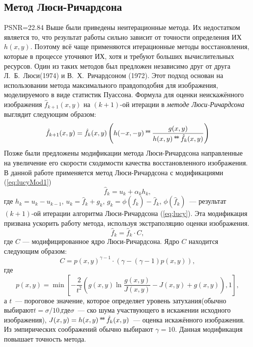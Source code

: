 \subsection{Метод Люси-Ричардсона}
PSNR=22.84
Выше были приведены неитерационные метода. Их недостатком является то, что результат работы сильно зависит от точности определения ИХ $h(x,y)$. Поэтому всё чаще применяются итерационные методы восстановления, которые в процессе уточняют ИХ, хотя и требуют больших вычислительных ресурсов. Один из таких методов был предложен независимо друг от друга Л.~Б.~Люси(1974)\cite{lucy} и В.~Х.~Ричардсоном (1972)\cite{richardson}. Этот подход основан на использовании метода максимального правдоподобия для изображения, моделируемого в виде статистик Пуассона. Формула для оценки неискажённого изображения $\hat{f}_{k+1}(x,y)$ на $(k + 1)$-ой итерации в \textit{методе Люси-Ричардсона} выглядит следующим образом:
\begin{equation}\label{eq:lucy}
	\hat{f}_{k+1}(x,y) = \hat{f}_k(x,y) \left(h(-x,-y) \operatorname*{*\!*} \frac{g(x,y)}{h(x,y) \operatorname*{*\!*} \hat{f}_k(x,y)}\right)
\end{equation}
Позже были предложены модификации метода Люси-Ричардсона \cite{richardsonLucyModifiedBiggs} направленные на увеличение его скорости сходимости качества восстановленного изображения. В данной работе применяется метод Люси-Ричардсона с модификациями (\ref{eq:lucyMod1})%
\begin{equation}\label{eq:lucyMod1}
	\hat{f}_k=u_k+\alpha_k h_k,
\end{equation}
где $h_k = u_k - u_{k-1}$, $u_k = \hat{f}_k + g_k$, $g_k = \phi(\hat{f}_k)-\hat{f}_k$, $\phi(\hat{f}_k)$~--- результат $(k+1)$-ой итерации алгоритма Люси-Ричардсона (\ref{eq:lucy}). Эта модификация призвана ускорить работу метода, используя экстраполяцию оценки изображения.   
\begin{equation}
	\hat{f}_k=\hat{f}_k \cdot C,
\end{equation}
где $C$ — модифицированное ядро Люси-Ричардсона. Ядро $C$ находится следующим образом:
\begin{equation}
	C = p(x,y)^{\gamma-1}\cdot (\gamma-(\gamma-1)p(x,y)),
\end{equation}
где
\begin{equation}
	p(x,y) = \min\left[
		-\frac{2}{t^2}\left(
			g(x,y)\ln\frac{g(x,y)}{J(x,y)}-J(x,y)+g(x,y)
		\right), 1
	\right],
\end{equation}
а $t$~--- пороговое значение, которое определяет уровень затухания(обычно выбирают$t=\sigma/10$,где$\sigma$~--- ско шума участвующего в искажении исходного изображения), $J(x,y) =h(x,y) \operatorname*{*\!*} \hat{f}_k(x,y)$~--- оценка искажённого изображения. Из эмпирических соображений обычно выбирают $\gamma=10$. Данная модификация повышает точность метода. 

